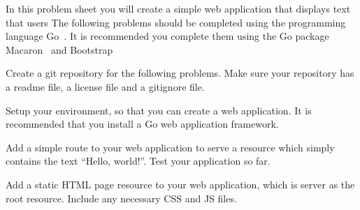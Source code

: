 
\noindent
In this problem sheet you will create a simple web application that displays text that users 
The following problems should be completed using the programming language Go~\cite{gowebsite}.
It is recommended you complete them using the Go package Macaron~\cite{macaronwebsite} and Bootstrap~\cite{bootstrapwebsite}


\begin{questions}


\question
Create a git repository for the following problems.
Make sure your repository has a readme file, a license file and a gitignore file. 


\question
Setup your environment, so that you can create a web application.
It is recommended that you install a Go web application framework.


\question
Add a simple route to your web application to serve a resource which simply contains the text ``Hello, world!''.
Test your application so far.


\question
Add a static HTML page resource to your web application, which is server as the root resource.
Include any necessary CSS and JS files.


\question






\end{questions}
